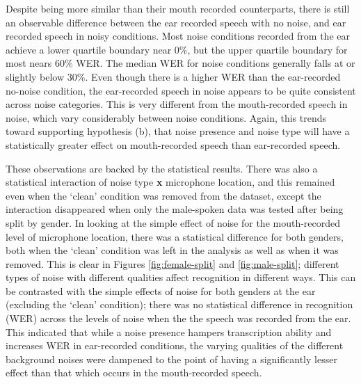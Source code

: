 Despite being more similar than their mouth recorded counterparts, there is still an observable difference between the ear recorded speech with no noise, and ear recorded speech in noisy conditions.  Most noise conditions recorded from the ear achieve a lower quartile boundary near 0\%, but the upper quartile boundary for most nears 60\% WER.  The median WER for noise conditions generally falls at or slightly below 30\%. 
Even though there is a higher WER than the ear-recorded no-noise condition, the ear-recorded speech in noise appears to be quite consistent across noise categories.  This is very different from the mouth-recorded speech in noise, which vary considerably between noise conditions. Again, this trends toward supporting hypothesis (b), that noise presence and noise type will have a statistically greater effect on mouth-recorded speech than ear-recorded speech.

These observations are backed by the statistical results.  There was also a statistical interaction of noise type \textbf{x} microphone location, and this remained even when the `clean' condition was removed from the dataset, except the interaction disappeared when only the male-spoken data was tested after being split by gender.  In looking at the simple effect of noise for the mouth-recorded level of microphone location, there was a statistical difference for both genders, both when the `clean' condition was left in the analysis as well as when it was removed.  This is clear in Figures \ref{fig:female-split} and \ref{fig:male-split}; different types of noise with different qualities affect recognition in different ways.  This can be contrasted with the simple effects of noise for both genders at the ear (excluding the `clean' condition); there was no statistical difference in recognition (WER) across the levels of noise when the the speech was recorded from the ear.  This indicated that while a noise presence hampers transcription ability and increases WER in ear-recorded conditions, the varying qualities of the different background noises were dampened to the point of having a significantly lesser effect than that which occurs in the mouth-recorded speech.

